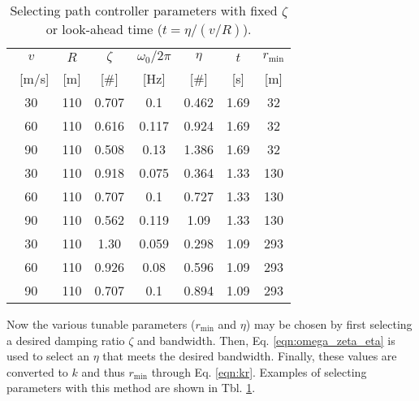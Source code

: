 \documentclass{article} %
\begin{document}
\begin{table}
\begin{center}
\begin{tabular}{ccccccc}
\hline
\hline
$v$ & $R$ & $\zeta$ & $\omega_0/2 \pi$ & $\eta$ & $t$ & $r_{\mathrm{min}}$ \\\
[m/s] & [m] & [\#] & [Hz] & [\#] & [s] & [m] \\
\hline
30 & 110 & 0.707 & 0.1 & 0.462 & 1.69 & 32 \\
60 & 110 & 0.616 & 0.117 & 0.924 & 1.69 & 32 \\
90 & 110 & 0.508 & 0.13 & 1.386 & 1.69 & 32 \\
\hline
30 & 110 & 0.918 & 0.075 & 0.364 & 1.33 & 130 \\
60 & 110 & 0.707 & 0.1 & 0.727 & 1.33 & 130 \\
90 & 110 & 0.562 & 0.119 & 1.09 & 1.33 & 130 \\
\hline
30 & 110 & 1.30 & 0.059 & 0.298 & 1.09 & 293 \\
60 & 110 & 0.926 & 0.08 & 0.596 & 1.09 & 293 \\
90 & 110 & 0.707 & 0.1 & 0.894 & 1.09 & 293 \\
\hline
\hline
\end{tabular}
\caption{Selecting path controller parameters with fixed $\zeta$ or
  look-ahead time ($t = \eta / (v/R)$).}
\label{tbl:choose_parameters}
\end{center}
\end{table}

Now the various tunable parameters ($r_{\mathrm{min}}$ and $\eta$) may
be chosen by first selecting a desired damping ratio $\zeta$ and
bandwidth.  Then, Eq. \ref{eqn:omega_zeta_eta} is used to select an
$\eta$ that meets the desired bandwidth.  Finally, these values are
converted to $k$ and thus $r_{\mathrm{min}}$ through Eq. \ref{eqn:kr}.
Examples of selecting parameters with this method are shown in
Tbl. \ref{tbl:choose_parameters}.
\end{document}
